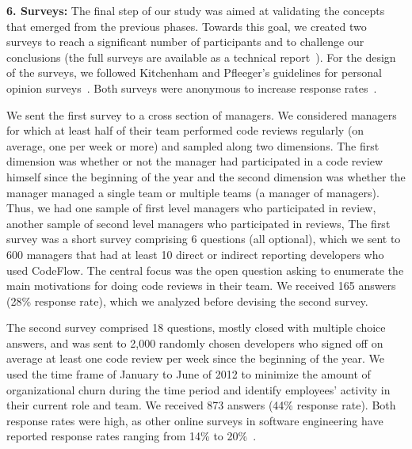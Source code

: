 \textbf{6. Surveys:} The final step of our study was aimed at validating the
concepts that emerged from the previous phases. Towards this goal, we created
two surveys to reach a significant number of participants and to challenge our
conclusions (the full surveys are available as a technical report~\cite{bacchelli2012appendix}). 
For the design of the surveys, we followed Kitchenham and
Pfleeger's guidelines for personal opinion surveys~\cite{kitchenham2008personal}. 
Both surveys were anonymous to increase response rates~\cite{tyagi1989effects}.

We sent the first survey to a cross section of managers.  We considered
managers for which at least half of their team performed code reviews regularly
(on average, one per week or more) and sampled along two dimensions.  The first
dimension was whether or not the manager had participated in a code review
himself since the beginning of the year and the second dimension was whether
the manager managed a single team or multiple teams (a manager of managers).
Thus, we had one sample of first level managers who participated in review,
another sample of second level managers who participated in reviews, \etc  The
first survey was a short survey comprising 6 questions (all optional), which we
sent to 600 managers that had at least 10 direct or indirect reporting
developers who used CodeFlow. The central focus was the open
question asking to enumerate the main motivations for doing code reviews in
their team. We received 165 answers (28\% response rate), which we analyzed
before devising the second survey.

The second survey comprised 18 questions, mostly closed with multiple choice
answers, and was sent to 2,000 randomly chosen developers who signed off on
average at least one code review per week since the beginning of the year. We
used the time frame of January to June of 2012 to minimize the amount of
organizational churn during the time period and identify employees' activity in
their current role and team.  We received 873 answers (44\% response rate). Both
response rates were  high, as other online surveys in software engineering have
reported response rates ranging from 14\% to 20\%~\cite{punter2003conducting}.




